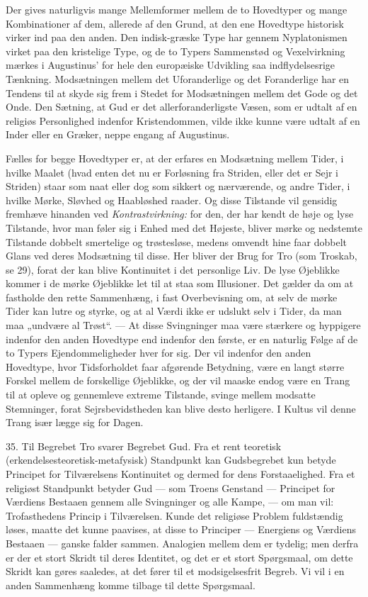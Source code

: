 \documentclass[12pt,a4paper,openany]{book}
\newcommand{\opage}[1]{\marginnote{\footnotesize\textit{[#1]}}}
\begin{document}
Der gives naturligvis mange Mellemformer mellem de to Hovedtyper og
mange Kombinationer af dem, allerede af den Grund, at den ene Hovedtype
historisk virker ind paa den anden. Den indisk-græske Type har gennem
Nyplatonismen virket paa den kristelige Type, og de to Typers Sammenstød
og Vexelvirkning mærkes i Augustinus’ for hele den europæiske Udvikling
saa indflydelsesrige Tænkning. Modsætningen mellem det Uforanderlige og
det Foranderlige har en Tendens til at skyde sig frem i Stedet for
Modsætningen mellem det Gode og det Onde. Den Sætning, at Gud er det
allerforanderligste Væsen, som er udtalt af en religiøs Personlighed
indenfor Kristendommen, vilde ikke kunne være udtalt af en Inder eller
en Græker, neppe engang af Augustinus.

Fælles for begge Hovedtyper er, at der erfares en Modsætning mellem
Tider, i hvilke Maalet (hvad enten det nu er Forløsning fra Striden,
eller det er Sejr i Striden) staar som naat eller dog som sikkert og
nærværende, og andre Tider, i hvilke Mørke, Sløvhed og Haabløshed
raader. Og disse Tilstande
\opage{83}vil gensidig fremhæve hinanden ved \textit{Kontrastvirkning:}
for den, der har kendt de høje og lyse Tilstande, hvor man føler sig i
Enhed med det Højeste, bliver mørke og nedstemte Tilstande dobbelt
smertelige og trøstesløse, medens omvendt hine faar dobbelt Glans ved
deres Modsætning til disse. Her bliver der Brug for Tro (som Troskab, se
29), forat der kan blive Kontinuitet i det personlige Liv. De lyse
Øjeblikke kommer i de mørke Øjeblikke let til at staa som Illusioner.
Det gælder da om at fastholde den rette Sammenhæng, i fast Overbevisning
om, at selv de mørke Tider kan lutre og styrke, og at al Værdi ikke er
udslukt selv i Tider, da man maa „undvære al Trøst“. --- At disse
Svingninger maa være stærkere og hyppigere indenfor den anden Hovedtype
end indenfor den første, er en naturlig Følge af de to Typers
Ejendommeligheder hver for sig. Der vil indenfor den anden Hovedtype,
hvor Tidsforholdet faar afgørende Betydning, være en langt større
Forskel mellem de forskellige Øjeblikke, og der vil maaske endog være en
Trang til at opleve og gennemleve extreme Tilstande, svinge mellem
modsatte Stemninger, forat Sejrsbevidstheden kan blive desto herligere.
I Kultus vil denne Trang især lægge sig for Dagen.

35. Til Begrebet Tro svarer Begrebet Gud. Fra et rent teoretisk
(erkendelsesteoretisk-metafysisk) Standpunkt kan Gudsbegrebet kun betyde
Principet for Tilværelsens Kontinuitet og dermed for dens
Forstaaelighed. Fra et religiøst Standpunkt betyder Gud --- som Troens
Genstand --- Principet for Værdiens Bestaaen gennem alle Svingninger og
alle Kampe, --- om man vil: Trofasthedens Princip i Tilværelsen. Kunde
det religiøse Problem fuldstændig løses, maatte det kunne paavises, at
disse to Principer --- Energiens og Værdiens Bestaaen --- ganske falder
sammen. Analogien mellem dem er tydelig; men derfra er der et stort
Skridt til deres Identitet, og det er et stort Spørgsmaal, om dette
Skridt kan gøres saaledes, at det fører til et modsigelsesfrit Begreb.
Vi vil i en anden Sammenhæng komme tilbage til dette Spørgsmaal.
\end{document}
